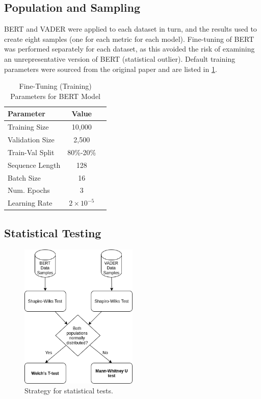 \documentclass{csfourzero}
\begin{document}
\subsection{Population and Sampling}

BERT and VADER were applied to each dataset in turn, and the results used to create eight samples (one for each metric for each model). Fine-tuning of BERT was performed separately for each dataset, as this avoided the risk of examining an unrepresentative version of BERT (statistical outlier). Default training parameters were sourced from the original paper\cite{BERT1} and are listed in \ref{tab:trainingParameters}.

\par
\begin{table}[ht]
    \centering
    \begin{tabular}[t]{lcc}
        \hline
        Parameter & Value \\
        \hline
        Training Size & 10,000 \\
        Validation Size & 2,500 \\
        Train-Val Split  & 80\%-20\% \\
        Sequence Length & 128 \\
        Batch Size & 16 \\
        Num. Epochs & 3 \\
        Learning Rate & $2 \times 10^{-5}$
        \hline
    \end{tabular}
    \caption{Fine-Tuning (Training) Parameters for BERT Model}
    \label{tab:trainingParameters}
\end{table}
\par

\subsection{Statistical Testing}

\par
\begin{figure}[h]
    \centering
    \includegraphics[width=0.5\textwidth]{img/statistical_tests.png}
    \caption{Strategy for statistical tests.}
    \label{fig:statstrat}
\end{figure}
\par
\end{document}
